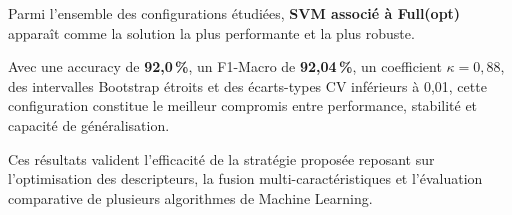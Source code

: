 Parmi l'ensemble des configurations étudiées, \textbf{SVM associé à Full(opt)} apparaît comme
la solution la plus performante et la plus robuste.

Avec une accuracy de \textbf{92,0\,\%}, un F1-Macro de \textbf{92,04\,\%}, un coefficient
$\kappa = 0{,}88$, des intervalles Bootstrap étroits et des écarts-types CV inférieurs à 0,01,
cette configuration constitue le meilleur compromis entre performance, stabilité et capacité de
généralisation.

Ces résultats valident l'efficacité de la stratégie proposée reposant sur l'optimisation des
descripteurs, la fusion multi-caractéristiques et l'évaluation comparative de plusieurs
algorithmes de Machine Learning.
